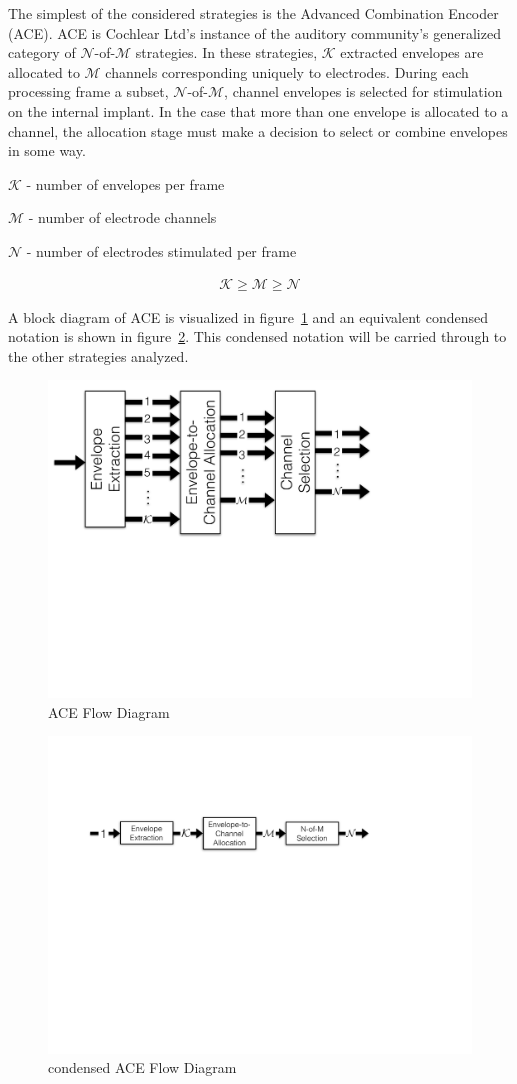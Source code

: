 \documentclass [11pt, proquest,oneside] {ganter_thesis}[2015/03/03]
\begin{document}
The simplest of the considered strategies is the Advanced Combination Encoder (ACE).  ACE is Cochlear Ltd's instance of the auditory community's generalized category of $\mathcal{N}$-of-$\mathcal{M}$ strategies.  In these strategies, $\mathcal{K}$ extracted envelopes are allocated to $\mathcal{M}$ channels corresponding uniquely to electrodes.  During each processing frame a subset, $\mathcal{N}$-of-$\mathcal{M}$, channel envelopes is selected for stimulation on the internal implant.  In the case that more than one envelope is allocated to a channel, the allocation stage must make a decision to select or combine envelopes in some way.

$\mathcal{K}$ - number of envelopes per frame

$\mathcal{M}$ - number of electrode channels

$\mathcal{N}$ - number of electrodes stimulated per frame

\begin{align}
\mathcal{K} \geq \mathcal{M} \geq \mathcal{N} \nonumber
\end{align}

A block diagram of ACE is visualized in figure~\ref{fig:ace_flow_diagram} and an equivalent condensed notation is shown in figure~\ref{fig:ace_flow_diagram_condensed}.  This condensed notation will be carried through to the other strategies analyzed.

\begin{figure}[!ht]
  \centering
    \includegraphics[width=.5\textwidth]{ACE_flow_diagram_explicit}   
    \caption{ACE Flow Diagram}\label{fig:ace_flow_diagram}
\end{figure}

\begin{figure}[!ht]
  \centering
    \includegraphics[width=.7\textwidth]{ACE_flow_diagram}   
    \caption{condensed ACE Flow Diagram}\label{fig:ace_flow_diagram_condensed}
\end{figure}
\end{document}
